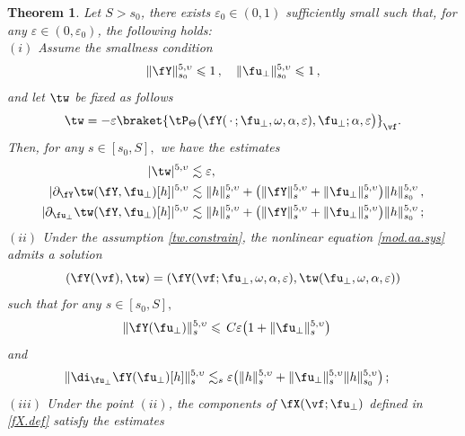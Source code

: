 \documentclass[a4paper,reqno,10pt]{article}
\newtheorem{theo}{Theorem}[section]
\newcommand{\pa}{\partial}
\begin{document}
\begin{theo}	\label{theo.FP.tangential}
Let $S>s_0$, there exists $\varepsilon_{0} \in (0,1)$ sufficiently small such that, for any $\varepsilon \in (0,\varepsilon_{0})$, 
    the following holds:
\\[1mm]
\noindent $(i)$
	Assume  the smallness condition
    $$
    \| \fY\|_{s_0}^{5,\upsilon} \leqslant 1\,,\quad  \| \fu_{\perp}\|_{s_0}^{5,\upsilon} \leqslant1 \,,
    $$
    and let  $\tw$ be fixed as follows
	\begin{equation}\label{tw.constrain}
		\tw =-\varepsilon \braket{\tP_{\Theta}\big(\fY(\,\cdot\,;\fu_{\perp},\omega,\alpha,\varepsilon),\fu_{\perp};\alpha,\varepsilon\big)}_{\vf}.
	\end{equation}
	Then, for any $s\in[s_0,S],$ we have the estimates
	\begin{align}\label{tw.est}
		|\tw|^{5,\upsilon} &\lesssim \varepsilon,\\ %
			| \pa_{\fY}\tw(\fY,\fu_{\perp})[h] |^{5,\upsilon} &\lesssim  \| h \|_{s}^{5,\upsilon} +\big( \| \fY\|_{s}^{5,\upsilon} + \| \fu_{\perp}\|_{s}^{5,\upsilon} \big) \| h \|_{s_0}^{5,\upsilon} \,, \\
		| \pa_{\fu_{\perp}}\tw(\fY,\fu_{\perp})[h] |^{5,\upsilon} &\lesssim %
        \| h \|_{s}^{5,\upsilon}+  \big( \| \fY\|_{s}^{5,\upsilon} + \| \fu_{\perp}\|_{s}^{5,\upsilon} \big) \| h \|_{s_0}^{5,\upsilon} \,;
	\end{align}
   \noindent $(ii)$ Under the assumption \eqref{tw.constrain}, the nonlinear equation \eqref{mod.aa.sys} admits a  solution $$(\fY(\vf),\tw)=(\fY(\vf;\fu_{\perp},\omega,\alpha,\varepsilon),\tw(\fu_{\perp}, \omega,\alpha,\varepsilon))
   $$
   such that for any $s\in[s_0,S],$
   \begin{align*}
		\| \fY(\fu_{\perp}) \|_{s}^{5,\upsilon} &\leqslant\,C\varepsilon \big(1+ \| \fu_{\perp}\|_{s}^{5,\upsilon} \big)
	\end{align*}
    and
    \begin{align*}
   	\| \di_{\fu_{\perp}} \fY(\fu_{\perp}) [h] \|_{s}^{5,\upsilon} 
   	& \lesssim_{s}  \varepsilon\big(  \| h\|_{s}^{5,\upsilon}  +  \| \fu_{\perp}\|_{s}^{5,\upsilon}   \| h\|_{s_0}^{5,\upsilon}  \big) \,;
   \end{align*}
\noindent $(iii)$  Under the point $(ii)$, the components of $\fX(\vf;\fu_{\perp})$ defined in \eqref{fX.def} satisfy the estimates

\end{theo}
\end{document}
